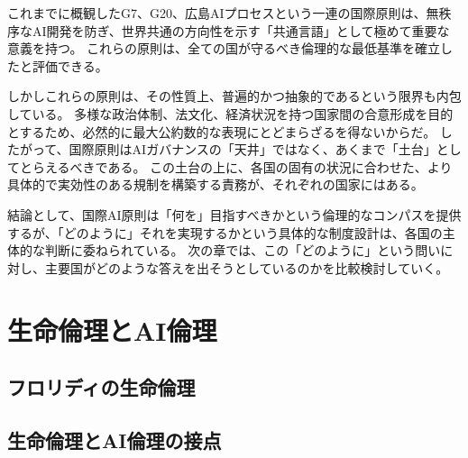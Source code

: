 これまでに概観したG7、G20、広島AIプロセスという一連の国際原則は、無秩序なAI開発を防ぎ、世界共通の方向性を示す「共通言語」として極めて重要な意義を持つ。
これらの原則は、全ての国が守るべき倫理的な最低基準を確立したと評価できる。

しかしこれらの原則は、その性質上、普遍的かつ抽象的であるという限界も内包している。
多様な政治体制、法文化、経済状況を持つ国家間の合意形成を目的とするため、必然的に最大公約数的な表現にとどまらざるを得ないからだ。
したがって、国際原則はAIガバナンスの「天井」ではなく、あくまで「土台」としてとらえるべきである。
この土台の上に、各国の固有の状況に合わせた、より具体的で実効性のある規制を構築する責務が、それぞれの国家にはある。

結論として、国際AI原則は「何を」目指すべきかという倫理的なコンパスを提供するが、「どのように」それを実現するかという具体的な制度設計は、各国の主体的な判断に委ねられている。
次の章では、この「どのように」という問いに対し、主要国がどのような答えを出そうとしているのかを比較検討していく。


\section{生命倫理とAI倫理} %

\subsection{フロリディの生命倫理}

\subsection{生命倫理とAI倫理の接点}





